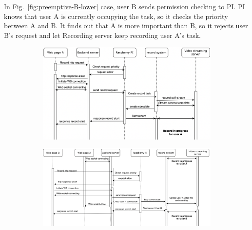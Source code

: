 In Fig.~\ref{fig:preemptive-B-lower} case, user B sends permission checking to PI. PI knows that user A is currently occupying the task, so it checks the priority between A and B. It finds out that A is more important than B, so it rejects user B's request and let Recording server keep recording user A's task.

\begin{figure}[H]
    \centering
    \begin{subfigure}{\textwidth}
        \includegraphics[width=\textwidth]{figsrc/preemptive-a.png}
        \label{fig:preemptive-a}
    \end{subfigure}

\end{figure}

\begin{figure}[H]
    \ContinuedFloat
    \centering
    \begin{subfigure}{\textwidth}
        \includegraphics[width=\textwidth]{figsrc/preemptive-B-higher.png}
        \label{fig:preemptive-B-higher}
    \end{subfigure}

\end{figure}

